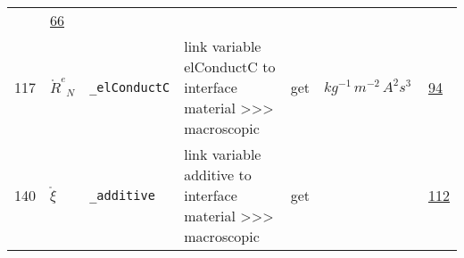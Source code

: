 \begin{longtable}{|p{1cm}|p{2.5cm}|p{4.5cm}|p{8cm}|p{3.0cm}|p{3cm}|p{1cm}|}
             & \hyperlink{"e:66"}{ 66 }
                 \\
    117
             & \hypertarget{"v:117"}{ $ {{\mathring R^e}}{_{N}} $}
             & \verb|_elConductC|
             & link variable elConductC to interface material >>> macroscopic
             & \begin{lay}get \end{lay}
             & $ kg^{-1} \,m^{-2} \,A^{2} s^{3} \, $
             & \hyperlink{"e:94"}{ 94 }
                 \\
    140
             & \hypertarget{"v:140"}{ $ {{\mathring \xi}}{_{}} $}
             & \verb|_additive|
             & link variable additive to interface material >>> macroscopic
             & \begin{lay}get \end{lay}
             & $  $
             & \hyperlink{"e:112"}{ 112 }
                 \\
    \end{longtable}